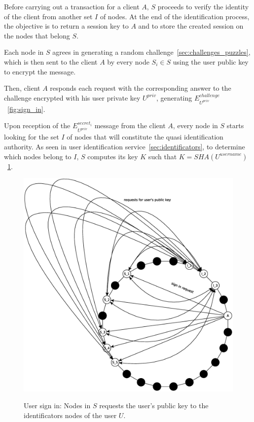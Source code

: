 Before carrying out a transaction for a client $A$, $S$ proceeds to
verify the identity of the client from another set $I$ of nodes. At the end of
the identification process, the objective is to return a session key to $A$
and to store the created session on the nodes that belong $S$.

Each node in $S$ agrees in generating a random challenge~\ref{sec:challenges_puzzles}, which is then sent to the
client $A$ by every node $S_i \in S$ using the user public key to encrypt the
message.

Then, client $A$ responds each request with the corresponding answer to the
challenge encrypted with his user private key $U^{priv}$, generating
$E^{challenge}_{U^{priv}}$~\ref{fig:sign_in}. 

Upon reception of the $E^{secret_i}_{U^{priv}}$ message from the client $A$, every node in $S$
starts looking for the set $I$ of nodes that will constitute the quasi
identification authority. As seen in user identification service~\ref{sec:identificators}, to
determine which nodes belong to $I$, $S$ computes
its key $K$ such that $K = SHA(U^{username})$~\ref{fig:sign_in_2}.

\begin{figure}[!htb]
\centering
\includegraphics[width=14cm]{../img/sign_in_2}\\
\caption{User sign in: Nodes in $S$ requests the user's public key to the
identificators nodes of the user $U$.}
\label{fig:sign_in_2}
\end{figure}

